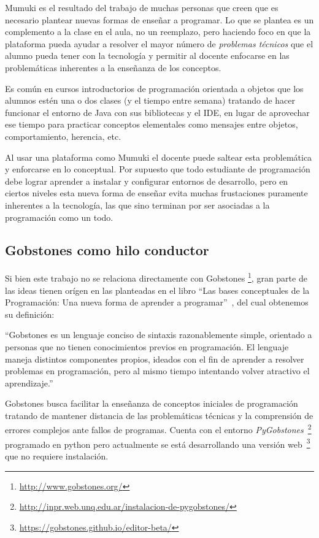 Mumuki es el resultado del trabajo de muchas personas que creen
que es necesario plantear nuevas formas de enseñar a programar.
Lo que se plantea es un complemento a la clase en el aula, no
un reemplazo, pero haciendo foco en que la plataforma pueda ayudar
a resolver el mayor número de \textit{problemas técnicos}
que el alumno pueda tener con la tecnología y permitir al docente enfocarse
en las problemáticas inherentes a la enseñanza de los conceptos.

Es común en cursos introductorios de programación orientada a objetos que los alumnos
estén una o dos clases (y el tiempo entre semana) tratando de hacer funcionar
el entorno de Java con sus bibliotecas y el IDE, en lugar de
aprovechar ese tiempo para practicar conceptos elementales como mensajes
entre objetos, comportamiento, herencia, etc.

Al usar una plataforma como Mumuki el docente puede saltear esta problemática
y enforcarse en lo conceptual. Por supuesto que todo estudiante de programación
debe lograr aprender a instalar y configurar entornos de desarrollo, pero
en ciertos niveles esta nueva forma de enseñar evita muchas
frustaciones puramente inherentes a la tecnología,
las que sino terminan por ser asociadas a la programación como un todo.

\subsection{Gobstones como hilo conductor}

Si bien este trabajo no se relaciona directamente con Gobstones
\footnote{\url{http://www.gobstones.org/}},
gran parte de las ideas tienen orígen en las planteadas en el libro
\enquote{Las bases conceptuales de la Programación: Una nueva forma de aprender a programar}~\cite{LibroGobstones}, del cual obtenemos su definición:

\begin{displayquote}
``Gobstones es un lenguaje conciso de sintaxis razonablemente simple,
orientado a personas que no tienen conocimientos previos en programación.
El lenguaje maneja distintos componentes propios, ideados con el fin de
aprender a resolver problemas en programación, pero al mismo tiempo
intentando volver atractivo el aprendizaje.''
\end{displayquote}

Gobstones busca facilitar la enseñanza de conceptos iniciales de programación
tratando de mantener distancia de las problemáticas técnicas y
la comprensión de errores complejos ante fallos de programas.
Cuenta con el entorno \textit{PyGobstones}~\footnote{\url{http://inpr.web.unq.edu.ar/instalacion-de-pygobstones/}} programado en python
pero actualmente se está desarrollando una versión web~\footnote{\url{https://gobstones.github.io/editor-beta/}} que no requiere instalación.


